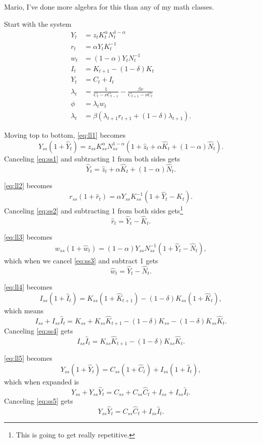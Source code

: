 \documentclass[11pt]{article}
\numberwithin{equation}{section} %
\numberwithin{figure}{section} %
\numberwithin{table}{section} %
\theoremstyle{definition}
\begin{document}
Mario, I've done more algebra for this than any of my math classes.

Start with the system
\begin{align}
    Y_t &= z_t K_t^\alpha N_t^{1-\alpha} \label{eq:ll1} \\
    r_t &= \alpha Y_t K_t^{-1} \label{eq:ll2} \\
    w_t &= (1 - \alpha) Y_t N_t^{-1} \label{eq:ll3} \\
    I_t &= K_{t + 1} - (1 - \delta) K_t \label{eq:ll4} \\
    Y_t &= C_t + I_t \label{eq:ll5} \\
    \lambda_t &= \frac{1}{C_t - \nu C_{t-1}} - \frac{\beta \nu}{C_{t+1} - \nu C_t} \label{eq:ll6} \\
    \phi &= \lambda_t w_t \label{eq:ll7} \\
    \lambda_t &= \beta(\lambda_{t+1} r_{t+1} + (1-\delta) \lambda_{t+1}). \label{eq:ll8}
\end{align}

Moving top to bottom, \ref{eq:ll1} becomes
\[
    Y_{ss} (1+\hat{Y}_t) = z_{ss} K_{ss}^\alpha N_{ss}^{1-\alpha} (1 + \hat{z}_t + \alpha \hat{K}_t + (1-\alpha) \hat{N}_t).
\]
Canceling \ref{eq:ss1} and subtracting 1 from both sides gets
\[
    \hat{Y}_t = \hat{z}_t + \alpha \hat{K}_t + (1-\alpha) \hat{N}_t.
\]

\ref{eq:ll2} becomes
\[
    r_{ss} (1 + \hat{r}_t) = \alpha Y_{ss} K_{ss}^{-1} (1 + \hat{Y}_t - \hat{K}_t).
\]
Canceling \ref{eq:ss2} and subtracting 1 from both sides gets\footnote{This is going to get really repetitive.}
\[
    \hat{r}_t = \hat{Y}_t - \hat{K}_t.
\]

\ref{eq:ll3} becomes
\[
    w_{ss} (1 + \hat{w}_t) = (1 - \alpha) Y_{ss} N_{ss}^{-1} (1 + \hat{Y}_t - \hat{N}_t),
\]
which when we cancel \ref{eq:ss3} and subtract 1 gets
\[
    \hat{w}_t = \hat{Y}_t - \hat{N}_t.
\]

\ref{eq:ll4} becomes
\[
    I_{ss} (1 + \hat{I}_t) = K_{ss} (1 + \hat{K}_{t + 1}) - (1 - \delta) K_{ss} (1 + \hat{K}_t),
\]
which means
\[
    I_{ss} + I_{ss} \hat{I}_t = K_{ss} + K_{ss} \hat{K}_{t + 1} - (1 - \delta) K_{ss} - (1 - \delta) K_{ss} \hat{K}_t.
\]
Canceling \ref{eq:ss4} gets
\[
    I_{ss} \hat{I}_t = K_{ss} \hat{K}_{t + 1} - (1 - \delta) K_{ss} \hat{K}_t.
\]

\ref{eq:ll5} becomes
\[
    Y_{ss} (1 + \hat{Y}_t) = C_{ss} (1 + \hat{C}_t) + I_{ss} (1 + \hat{I}_t),
\]
which when expanded is
\[
    Y_{ss} + Y_{ss} \hat{Y}_t = C_{ss} + C_{ss} \hat{C}_t + I_{ss} + I_{ss} \hat{I}_t.
\]
Canceling \ref{eq:ss5} gets
\[
    Y_{ss} \hat{Y}_t = C_{ss} \hat{C}_t + I_{ss} \hat{I}_t.
\]
\end{document}
